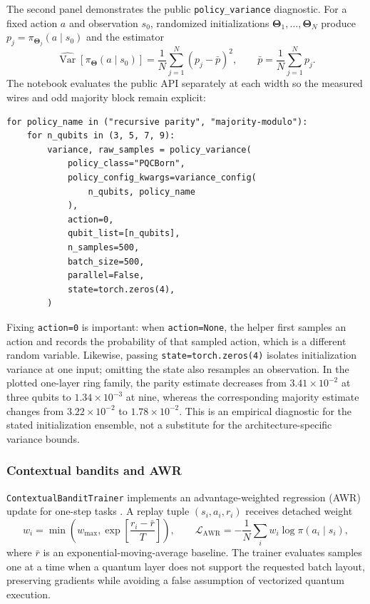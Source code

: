 \documentclass[10pt]{article}
\newcommand{\code}[1]{\texttt{#1}}
\begin{document}
The second panel demonstrates the public \code{policy\_variance} diagnostic.
For a fixed action $a$ and observation $s_0$, randomized initializations
$\bm\Theta_1,\ldots,\bm\Theta_N$ produce $p_j=\pi_{\bm\Theta_j}(a\mid s_0)$
and the estimator
\begin{equation}
  \widehat{\operatorname{Var}}[\pi_{\bm\Theta}(a\mid s_0)]
  =\frac{1}{N}\sum_{j=1}^{N}(p_j-\bar p)^2,
  \qquad \bar p=\frac{1}{N}\sum_{j=1}^{N}p_j.
  \label{eq:policy-variance-estimator}
\end{equation}
The notebook evaluates the public API separately at each width so the measured
wires and odd majority block remain explicit:
\begin{lstlisting}[caption={Controlled use of 
\code{policy\_variance}.  The notebook's 
\code{variance\_config} returns the complete width-specific dictionary from
\cref{lst:cartpole-policies}.},label={lst:policy-variance}]
for policy_name in ("recursive parity", "majority-modulo"):
    for n_qubits in (3, 5, 7, 9):
        variance, raw_samples = policy_variance(
            policy_class="PQCBorn",
            policy_config_kwargs=variance_config(
                n_qubits, policy_name
            ),
            action=0,
            qubit_list=[n_qubits],
            n_samples=500,
            batch_size=500,
            parallel=False,
            state=torch.zeros(4),
        )
\end{lstlisting}
Fixing \code{action=0} is important: when \code{action=None}, the helper first
samples an action and records the probability of that sampled action, which is
a different random variable.  Likewise, passing
\code{state=torch.zeros(4)} isolates initialization variance at one input;
omitting the state also resamples an observation.  In the plotted one-layer
ring family, the parity estimate decreases from $3.41\times10^{-2}$ at three
qubits to $1.34\times10^{-3}$ at nine, whereas the corresponding majority
estimate changes from $3.22\times10^{-2}$ to $1.78\times10^{-2}$.  This is an
empirical diagnostic for the stated initialization ensemble, not a substitute
for the architecture-specific variance bounds.

\subsubsection{Contextual bandits and AWR}

\code{ContextualBanditTrainer} implements an advantage-weighted regression (AWR) update for one-step tasks \cite{peng2019awr}.  A replay tuple $(s_i,a_i,r_i)$ receives detached weight
\begin{equation}
  w_i=\min\left(w_{\max},
    \exp\left[\frac{r_i-\bar r}{T}\right]\right),
  \qquad
  \mathcal{L}_{\mathrm{AWR}}=-\frac{1}{N}\sum_iw_i\log\pi(a_i\mid s_i),
\end{equation}
where $\bar r$ is an exponential-moving-average baseline.  The trainer evaluates samples one at a time when a quantum layer does not support the requested batch layout, preserving gradients while avoiding a false assumption of vectorized quantum execution.
\end{document}
